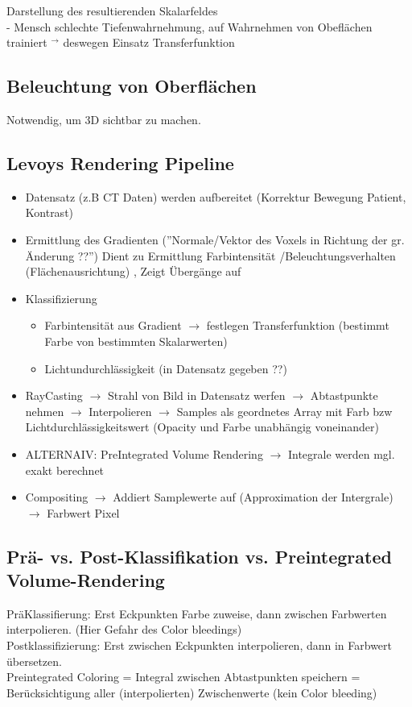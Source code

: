 \documentclass{article}
\begin{document}
\noindent Darstellung des resultierenden Skalarfeldes\\
- Mensch schlechte Tiefenwahrnehmung, auf Wahrnehmen von Obeflächen trainiert $^\rightarrow$ deswegen Einsatz Transferfunktion

\subsection{Beleuchtung von Oberflächen}
Notwendig, um 3D sichtbar zu machen.\\

\subsection{Levoys Rendering Pipeline}
\begin{itemize}
	\item Datensatz (z.B CT Daten) werden aufbereitet (Korrektur Bewegung Patient, Kontrast)
	\item Ermittlung des Gradienten (''Normale/Vektor des Voxels in Richtung der gr. Änderung ??'') Dient zu Ermittlung Farbintensität /Beleuchtungsverhalten (Flächenausrichtung) , Zeigt Übergänge auf
	\item Klassifizierung
	\begin{itemize}
		\item Farbintensität aus Gradient $\rightarrow$ festlegen Transferfunktion (bestimmt Farbe von bestimmten Skalarwerten) 
		\item Lichtundurchlässigkeit (in Datensatz gegeben ??)
	\end{itemize}
	\item RayCasting $\rightarrow$ Strahl von Bild in Datensatz werfen $\rightarrow$ Abtastpunkte nehmen $\rightarrow$ Interpolieren $\rightarrow$ Samples als geordnetes Array mit Farb bzw Lichtdurchlässigkeitswert (Opacity und Farbe unabhängig voneinander)
	\item ALTERNAIV: PreIntegrated Volume Rendering $\rightarrow$ Integrale werden mgl. exakt berechnet
	\item Compositing $\rightarrow$ Addiert Samplewerte auf (Approximation der Intergrale) $\rightarrow$ Farbwert Pixel 
\end{itemize}

\subsection{Prä- vs. Post-Klassifikation vs. Preintegrated Volume-Rendering}
PräKlassifierung: Erst Eckpunkten Farbe zuweise, dann zwischen Farbwerten interpolieren. (Hier Gefahr des Color bleedings)\\
Postklassifizierung: Erst zwischen Eckpunkten interpolieren, dann in Farbwert übersetzen.\\
Preintegrated Coloring = Integral zwischen Abtastpunkten speichern = Berücksichtigung aller (interpolierten) Zwischenwerte  (kein Color bleeding) \\
\end{document}
